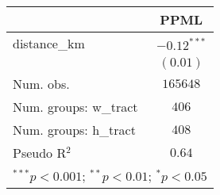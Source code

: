 
\begin{tabular}{l c}
\hline
 & PPML \\
\hline
distance\_km          & $-0.12^{***}$ \\
                      & $(0.01)$      \\
\hline
Num. obs.             & $165648$      \\
Num. groups: w\_tract & $406$         \\
Num. groups: h\_tract & $408$         \\
Pseudo R$^2$          & $0.64$        \\
\hline
\multicolumn{2}{l}{\scriptsize{$^{***}p<0.001$; $^{**}p<0.01$; $^{*}p<0.05$}}
\end{tabular}
